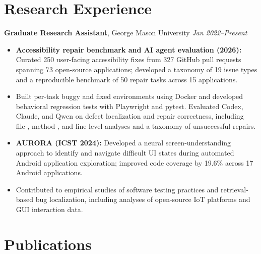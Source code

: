 \documentclass[a4paper,10pt]{article}
\begin{document}
\section{Research Experience}
\textbf{Graduate Research Assistant}, George Mason University \hfill \textit{Jan 2022--Present}
\begin{itemize}
\item \textbf{Accessibility repair benchmark and AI agent evaluation (2026):} Curated 250 user-facing accessibility fixes from 327 GitHub pull requests spanning 73 open-source applications; developed a taxonomy of 19 issue types and a reproducible benchmark of 50 repair tasks across 15 applications.
\item Built per-task buggy and fixed environments using Docker and developed behavioral regression tests with Playwright and pytest. Evaluated Codex, Claude, and Qwen on defect localization and repair correctness, including file-, method-, and line-level analyses and a taxonomy of unsuccessful repairs.
\item \textbf{AURORA (ICST 2024):} Developed a neural screen-understanding approach to identify and navigate difficult UI states during automated Android application exploration; improved code coverage by 19.6\% across 17 Android applications.
\item Contributed to empirical studies of software testing practices and retrieval-based bug localization, including analyses of open-source IoT platforms and GUI interaction data.
\end{itemize}


\section{Publications}
\end{document}
